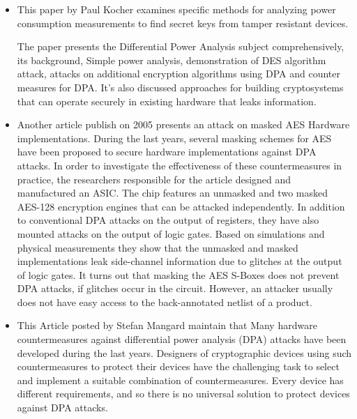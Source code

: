     \begin{itemize}
        \item   This paper \cite{kocher1999differential} by Paul Kocher examines specific methods for analyzing power consumption measurements to find secret keys from tamper resistant devices.

        The paper presents the Differential Power Analysis subject comprehensively, its background, Simple power analysis, demonstration of DES algorithm attack, attacks on additional encryption algorithms using DPA and counter measures for DPA.
        It’s also discussed approaches for building cryptosystems that can operate securely in existing hardware that leaks information.
        \item Another article publish on 2005 \cite{mangard2005successfully} presents an attack on masked AES Hardware implementations.
        During the last years, several masking schemes for AES have
        been proposed to secure hardware implementations against DPA attacks.
        In order to investigate the effectiveness of these countermeasures in practice,
        the researchers responsible for the article designed and manufactured an ASIC. The chip features an
        unmasked and two masked AES-128 encryption engines that can be attacked
        independently.
        In addition to conventional DPA attacks on the output of registers,
        they have also mounted attacks on the output of logic gates. Based on
        simulations and physical measurements they show that the unmasked and
        masked implementations leak side-channel information due to glitches
        at the output of logic gates. It turns out that masking the AES S-Boxes does not prevent DPA attacks, if glitches occur in the circuit. However, an attacker usually does not have easy access to the back-annotated
        netlist of a product.
        \item This Article posted by Stefan Mangard \cite{mangard2004hardware}
        maintain that  Many hardware countermeasures against differential power analysis (DPA) attacks have been developed during the last years. Designers of cryptographic devices using such countermeasures to protect their devices have the challenging task to select and implement a suitable combination of countermeasures. Every device has different requirements, and so there is no universal solution to protect devices against DPA  attacks.


\end{itemize}
